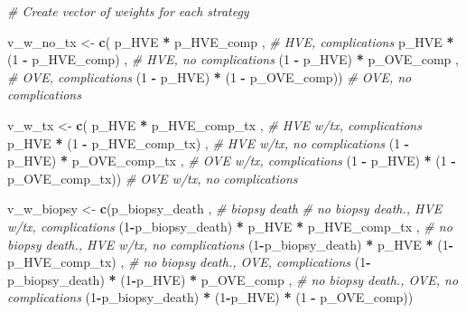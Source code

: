 \documentclass[
]{article}
\newenvironment{Shaded}{\begin{snugshade}}{\end{snugshade}}
\newcommand{\CommentTok}[1]{\textcolor[rgb]{0.56,0.35,0.01}{\textit{#1}}}
\newcommand{\DecValTok}[1]{\textcolor[rgb]{0.00,0.00,0.81}{#1}}
\newcommand{\KeywordTok}[1]{\textcolor[rgb]{0.13,0.29,0.53}{\textbf{#1}}}
\newcommand{\NormalTok}[1]{#1}
\newcommand{\OperatorTok}[1]{\textcolor[rgb]{0.81,0.36,0.00}{\textbf{#1}}}
\newcommand{\StringTok}[1]{\textcolor[rgb]{0.31,0.60,0.02}{#1}}
\begin{document}
\begin{Shaded}
\begin{Highlighting}[]
\CommentTok{# Create vector of weights for each strategy }
  
\NormalTok{v_w_no_tx  <-}\StringTok{ }\KeywordTok{c}\NormalTok{(    p_HVE  }\OperatorTok{*}\StringTok{      }\NormalTok{p_HVE_comp     ,  }\CommentTok{# HVE, complications}
\NormalTok{                    p_HVE  }\OperatorTok{*}\StringTok{ }\NormalTok{(}\DecValTok{1} \OperatorTok{-}\StringTok{ }\NormalTok{p_HVE_comp)    ,  }\CommentTok{# HVE, no complications}
\NormalTok{               (}\DecValTok{1} \OperatorTok{-}\StringTok{ }\NormalTok{p_HVE) }\OperatorTok{*}\StringTok{      }\NormalTok{p_OVE_comp     ,  }\CommentTok{# OVE, complications}
\NormalTok{               (}\DecValTok{1} \OperatorTok{-}\StringTok{ }\NormalTok{p_HVE) }\OperatorTok{*}\StringTok{ }\NormalTok{(}\DecValTok{1} \OperatorTok{-}\StringTok{ }\NormalTok{p_OVE_comp))      }\CommentTok{# OVE, no complications}
  
\NormalTok{v_w_tx     <-}\StringTok{ }\KeywordTok{c}\NormalTok{(    p_HVE  }\OperatorTok{*}\StringTok{      }\NormalTok{p_HVE_comp_tx  ,  }\CommentTok{# HVE w/tx, complications}
\NormalTok{                    p_HVE  }\OperatorTok{*}\StringTok{ }\NormalTok{(}\DecValTok{1} \OperatorTok{-}\StringTok{ }\NormalTok{p_HVE_comp_tx) ,  }\CommentTok{# HVE w/tx, no complications}
\NormalTok{               (}\DecValTok{1} \OperatorTok{-}\StringTok{ }\NormalTok{p_HVE) }\OperatorTok{*}\StringTok{      }\NormalTok{p_OVE_comp_tx  ,  }\CommentTok{# OVE w/tx, complications}
\NormalTok{               (}\DecValTok{1} \OperatorTok{-}\StringTok{ }\NormalTok{p_HVE) }\OperatorTok{*}\StringTok{ }\NormalTok{(}\DecValTok{1} \OperatorTok{-}\StringTok{ }\NormalTok{p_OVE_comp_tx))   }\CommentTok{# OVE w/tx, no complications}
  
\NormalTok{v_w_biopsy <-}\StringTok{ }\KeywordTok{c}\NormalTok{(p_biopsy_death                   ,  }\CommentTok{# biopsy death}
               \CommentTok{# no biopsy death.,   HVE w/tx,        complications}
\NormalTok{               (}\DecValTok{1}\OperatorTok{-}\NormalTok{p_biopsy_death)   }\OperatorTok{*}\StringTok{    }\NormalTok{p_HVE  }\OperatorTok{*}\StringTok{    }\NormalTok{p_HVE_comp_tx  ,  }
               \CommentTok{# no biopsy death.,   HVE w/tx,     no complications}
\NormalTok{               (}\DecValTok{1}\OperatorTok{-}\NormalTok{p_biopsy_death)   }\OperatorTok{*}\StringTok{    }\NormalTok{p_HVE  }\OperatorTok{*}\StringTok{ }\NormalTok{(}\DecValTok{1}\OperatorTok{-}\NormalTok{p_HVE_comp_tx) ,  }
               \CommentTok{# no biopsy death.,        OVE,        complications}
\NormalTok{               (}\DecValTok{1}\OperatorTok{-}\NormalTok{p_biopsy_death)   }\OperatorTok{*}\StringTok{ }\NormalTok{(}\DecValTok{1}\OperatorTok{-}\NormalTok{p_HVE) }\OperatorTok{*}\StringTok{      }\NormalTok{p_OVE_comp   ,  }
               \CommentTok{# no biopsy death.,        OVE,     no complications}
\NormalTok{               (}\DecValTok{1}\OperatorTok{-}\NormalTok{p_biopsy_death)   }\OperatorTok{*}\StringTok{ }\NormalTok{(}\DecValTok{1}\OperatorTok{-}\NormalTok{p_HVE) }\OperatorTok{*}\StringTok{ }\NormalTok{(}\DecValTok{1} \OperatorTok{-}\StringTok{ }\NormalTok{p_OVE_comp))      }
  

\end{Highlighting}
\end{Shaded}
\end{document}
